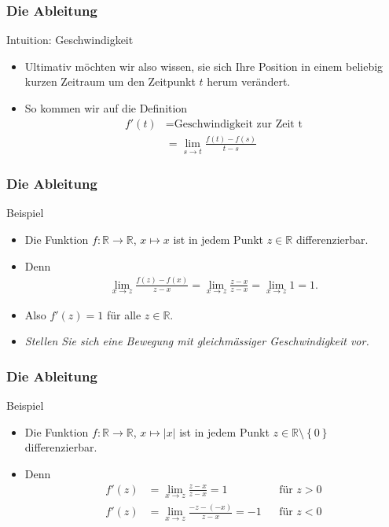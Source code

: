 \documentclass{beamer}
\newcommand\RR{\mathbb R}
\newcommand\cbc[1]{\left\{{#1}\right\}}
\renewcommand{\ae}{\"a}
\renewcommand{\oe}{\"o}
\newcommand{\ue}{\"u}
\newcommand{\mytitle}{Die Ableitung}
\begin{document}
\begin{frame}\frametitle{\mytitle}
	\begin{block}{Intuition: Geschwindigkeit}
		\begin{itemize}
			\item Ultimativ m\oe chten wir also wissen, sie sich Ihre Position in einem \alert{beliebig kurzen} Zeitraum \alert{um den Zeitpunkt $t$ herum} ver\ae ndert.
			\item So kommen wir auf die Definition
				\begin{align*}
					f'(t)&=\mbox{Geschwindigkeit zur Zeit t}\\
						 &=\lim_{s\to t}\frac{f(t)-f(s)}{t-s}
				\end{align*}
		\end{itemize}
	\end{block}
\end{frame}

\begin{frame}\frametitle{\mytitle}
	\begin{block}{Beispiel}
		\begin{itemize}
			\item Die Funktion $f:\RR\to\RR$, $x\mapsto x$ ist in jedem Punkt $z\in\RR$ differenzierbar.
			\item Denn
				\begin{align*}
					\lim_{x\to z}\frac{f(z)-f(x)}{z-x}=\lim_{x\to z}\frac{z-x}{z-x}=\lim_{x\to z}1=1.
				\end{align*}
			\item Also $f'(z)=1$ f\ue r alle $z\in\RR$.
			\item \itshape Stellen Sie sich eine Bewegung mit gleichm\ae ssiger Geschwindigkeit vor.
		\end{itemize}
	\end{block}
\end{frame}

\begin{frame}\frametitle{\mytitle}
	\begin{block}{Beispiel}
		\begin{itemize}
			\item Die Funktion $f:\RR\to\RR$, $x\mapsto |x|$ ist in jedem Punkt $z\in\RR\setminus\cbc 0$ differenzierbar.
			\item Denn 
				\begin{align*}
					f'(z)&=\lim_{x\to z}\frac{z-x}{z-x}=1&&\mbox{f\ue r }z>0\\
					f'(z)&=\lim_{x\to z}\frac{-z-(-x)}{z-x}=-1&&\mbox{f\ue r }z<0
				\end{align*}
		\end{itemize}
	\end{block}
\end{frame}
\end{document}
